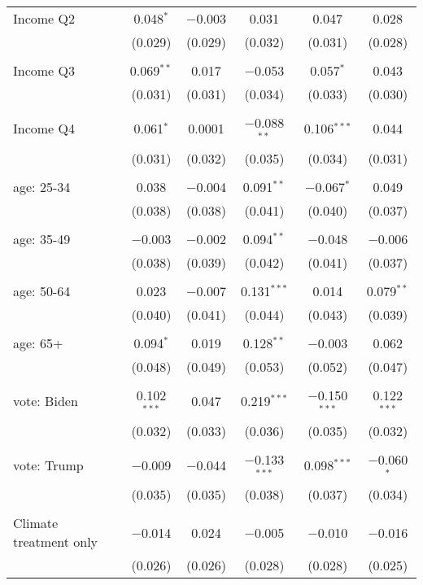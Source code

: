 \begin{tabular}{@{\extracolsep{5pt}}lccccc}
 Income Q2 & 0.048$^{*}$ & $-$0.003 & 0.031 & 0.047 & 0.028 \\ 
  & (0.029) & (0.029) & (0.032) & (0.031) & (0.028) \\ 
  & & & & & \\ 
 Income Q3 & 0.069$^{**}$ & 0.017 & $-$0.053 & 0.057$^{*}$ & 0.043 \\ 
  & (0.031) & (0.031) & (0.034) & (0.033) & (0.030) \\ 
  & & & & & \\ 
 Income Q4 & 0.061$^{*}$ & 0.0001 & $-$0.088$^{**}$ & 0.106$^{***}$ & 0.044 \\ 
  & (0.031) & (0.032) & (0.035) & (0.034) & (0.031) \\ 
  & & & & & \\ 
 age: 25-34 & 0.038 & $-$0.004 & 0.091$^{**}$ & $-$0.067$^{*}$ & 0.049 \\ 
  & (0.038) & (0.038) & (0.041) & (0.040) & (0.037) \\ 
  & & & & & \\ 
 age: 35-49 & $-$0.003 & $-$0.002 & 0.094$^{**}$ & $-$0.048 & $-$0.006 \\ 
  & (0.038) & (0.039) & (0.042) & (0.041) & (0.037) \\ 
  & & & & & \\ 
 age: 50-64 & 0.023 & $-$0.007 & 0.131$^{***}$ & 0.014 & 0.079$^{**}$ \\ 
  & (0.040) & (0.041) & (0.044) & (0.043) & (0.039) \\ 
  & & & & & \\ 
 age: 65+ & 0.094$^{*}$ & 0.019 & 0.128$^{**}$ & $-$0.003 & 0.062 \\ 
  & (0.048) & (0.049) & (0.053) & (0.052) & (0.047) \\ 
  & & & & & \\ 
 vote: Biden & 0.102$^{***}$ & 0.047 & 0.219$^{***}$ & $-$0.150$^{***}$ & 0.122$^{***}$ \\ 
  & (0.032) & (0.033) & (0.036) & (0.035) & (0.032) \\ 
  & & & & & \\ 
 vote: Trump & $-$0.009 & $-$0.044 & $-$0.133$^{***}$ & 0.098$^{***}$ & $-$0.060$^{*}$ \\ 
  & (0.035) & (0.035) & (0.038) & (0.037) & (0.034) \\ 
  & & & & & \\ 
 Climate treatment only & $-$0.014 & 0.024 & $-$0.005 & $-$0.010 & $-$0.016 \\ 
  & (0.026) & (0.026) & (0.028) & (0.028) & (0.025) \\ 

\end{tabular}
